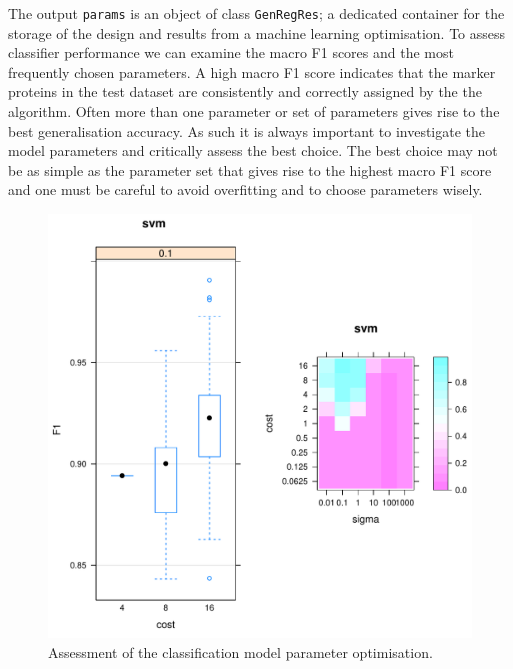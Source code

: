 The output \texttt{params} is an object of class \texttt{GenRegRes}; a
dedicated container for the storage of the design and results from a
machine learning optimisation. To assess classifier performance we can
examine the macro F1 scores and the most frequently chosen
parameters. A high macro F1 score indicates that the marker proteins
in the test dataset are consistently and correctly assigned by the the
algorithm. Often more than one parameter or set of parameters gives
rise to the best generalisation accuracy. As such it is always
important to investigate the model parameters and critically assess
the best choice. The best choice may not be as simple as the parameter
set that gives rise to the highest macro F1 score and one must be
careful to avoid overfitting and to choose parameters wisely.

\begin{knitrout}
\color{fgcolor}\begin{kframe}
\begin{alltt}
 \hlkwb{<-} 
\end{alltt}
\end{kframe}
\end{knitrout}

\begin{figure}[!ht]
  \centering
\begin{knitrout}
\color{fgcolor}
\includegraphics[width=.65\textwidth]{figure/visualiseOptHide-1} 

\end{knitrout}
  \caption{Assessment of the classification model parameter optimisation.}
  \label{fig:visualisOptHide}
\end{figure}

